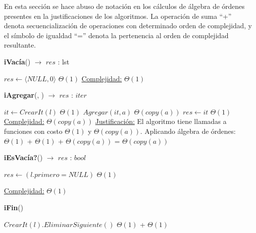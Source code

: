 \begin{Algoritmos}

En esta sección se hace abuso de notación en los cálculos de álgebra de órdenes presentes en la justificaciones de los algoritmos. La operación de suma ``+'' denota secuencialización de operaciones con determinado orden de complejidad, y el símbolo de igualdad ``='' denota la pertenencia al orden de complejidad resultante.

\medskip
	
  	\medskip
  
\begin{algorithm}[H]{\textbf{iVacía}() $\to$ $res$ : lst}
    	\begin{algorithmic}[1]
			 \State $res \gets \langle NULL, 0 \rangle$ \Comment $\Theta(1)$
			\medskip
			\Statex \underline{Complejidad:} $\Theta(1)$
    	\end{algorithmic}
\end{algorithm}

\begin{algorithm}[H]{\textbf{iAgregar}(, ) $\to$ $res$ : $iter$}
	\begin{algorithmic}
			 \State $it \gets CrearIt(l)$ 				\Comment $\Theta(1)$
			 \State $Agregar(it, a)$	\Comment $\Theta(copy(a))$
			 \State $res \gets it$					\Comment $\Theta(1)$
			\medskip
			\Statex \underline{Complejidad:} $\Theta(copy(a))$
			\Statex \underline{Justificación:} El algoritmo tiene llamadas a funciones con costo $\Theta(1)$ y $\Theta(copy(a))$. Aplicando álgebra de órdenes: \\ $\Theta(1)$ + $\Theta(1)$ + $\Theta(copy(a))$ = $\Theta(copy(a))$
    	\end{algorithmic}
\end{algorithm}	

\begin{algorithm}[H]{\textbf{iEsVacía?}() $\to$ $res$ : $bool$}
	\begin{algorithmic}[1]
			 \State $res \gets (l.primero = NULL)$	 \Comment $\Theta(1)$
    
			\medskip
			\Statex \underline{Complejidad:} $\Theta(1)$
    	\end{algorithmic}
\end{algorithm}	

\begin{algorithm}[H]{\textbf{iFin}()}
	\begin{algorithmic}[1]
			 \State $CrearIt(l).EliminarSiguiente()$	\Comment $\Theta(1)$ + $\Theta(1)$
			 

\end{algorithmic}
\end{algorithm}
\end{Algoritmos}
